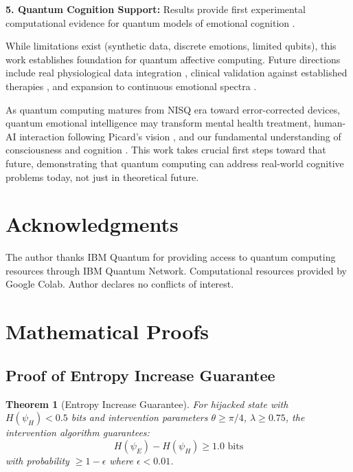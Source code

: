 \documentclass[11pt,letterpaper]{article}
\newtheorem{theorem}{Theorem}[section]
\begin{document}
\textbf{5. Quantum Cognition Support:} Results provide first experimental computational evidence for quantum models of emotional cognition \cite{busemeyer2012quantum,pothos2013can,aerts2009quantum}.

While limitations exist (synthetic data, discrete emotions, limited qubits), this work establishes foundation for quantum affective computing. Future directions include real physiological data integration \cite{schmidt2018introducing}, clinical validation against established therapies \cite{gross1998antecedent,keng2011effect}, and expansion to continuous emotional spectra \cite{barrett2017emotions}.

As quantum computing matures from NISQ era \cite{preskill2018quantum} toward error-corrected devices, quantum emotional intelligence may transform mental health treatment, human-AI interaction following Picard's vision \cite{picard2000affective}, and our fundamental understanding of consciousness and cognition \cite{busemeyer2012quantum}. This work takes crucial first steps toward that future, demonstrating that quantum computing can address real-world cognitive problems today, not just in theoretical future.

\section*{Acknowledgments}

The author thanks IBM Quantum for providing access to quantum computing resources through IBM Quantum Network. Computational resources provided by Google Colab. Author declares no conflicts of interest.

\appendix

\section{Mathematical Proofs}
\label{app:proofs}

\subsection{Proof of Entropy Increase Guarantee}

\begin{theorem}[Entropy Increase Guarantee]
\label{thm:entropy_increase}
For hijacked state with $H(\psi_H) < 0.5$ bits and intervention parameters $\theta \geq \pi/4$, $\lambda \geq 0.75$, the intervention algorithm guarantees:
\begin{equation}
H(\psi_E) - H(\psi_H) \geq 1.0 \text{ bits}
\end{equation}
with probability $\geq 1 - \epsilon$ where $\epsilon < 0.01$.
\end{theorem}
\end{document}
